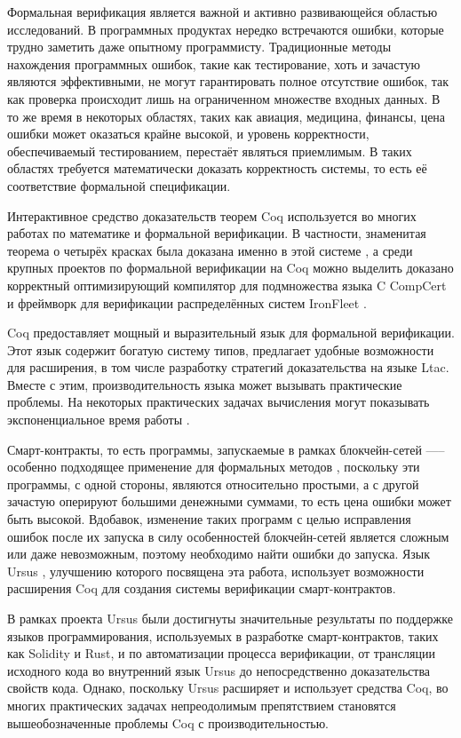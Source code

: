 \documentclass[../diploma.tex]{subfiles}
\begin{document}
 \label{sec:introduction}

Формальная верификация является важной и активно развивающейся областью исследований. В программных продуктах нередко встречаются ошибки, которые трудно заметить даже опытному программисту. Традиционные методы нахождения программных ошибок, такие как тестирование, хоть и зачастую являются эффективными, не могут гарантировать полное отсутствие ошибок, так как проверка происходит лишь на ограниченном множестве входных данных. В то же время в некоторых областях, таких как авиация, медицина, финансы, цена ошибки может оказаться крайне высокой, и уровень корректности, обеспечиваемый тестированием, перестаёт являться приемлимым. В таких областях требуется математически доказать корректность системы, то есть её соответствие формальной спецификации.

Интерактивное средство доказательств теорем Coq \cite{coq} используется во многих работах по математике и формальной верификации. В частности, знаменитая теорема о четырёх красках была доказана именно в этой системе \cite{4colors}, а среди крупных проектов по формальной верификации на Coq можно выделить доказано корректный оптимизирующий компилятор для подмножества языка C CompCert \cite{compcert} и фреймворк для верификации распределённых систем IronFleet \cite{ironfleet}.

Coq предоставляет мощный и выразительный язык для формальной верификации. Этот язык содержит богатую систему типов, предлагает удобные возможности для расширения, в том числе разработку стратегий доказательства на языке Ltac. Вместе с этим, производительность языка может вызывать практические проблемы. На некоторых практических задачах вычисления могут показывать экспоненциальное время работы \cite{coqslow} \cite{gross_phd}.

Смарт-контракты, то есть программы, запускаемые в рамках блокчейн-сетей —-- особенно подходящее применение для формальных методов \cite{smart_contracts}, поскольку эти программы, с одной стороны, являются относительно простыми, а с другой зачастую оперируют большими денежными суммами, то есть цена ошибки может быть высокой. Вдобавок, изменение таких программ с целью исправления ошибок после их запуска в силу особенностей блокчейн-сетей является сложным или даже невозможным, поэтому необходимо найти ошибки до запуска. Язык Ursus \cite{ursus}, улучшению которого посвящена эта работа, использует возможности расширения Coq для создания системы верификации смарт-контрактов. 

В рамках проекта Ursus были достигнуты значительные результаты по поддержке языков программирования, используемых в разработке смарт-контрактов, таких как Solidity и Rust, и по автоматизации процесса верификации, от трансляции исходного кода во внутренний язык Ursus до непосредственно доказательства свойств кода. Однако, поскольку Ursus расширяет и использует средства Coq, во многих практических задачах непреодолимым препятствием становятся вышеобозначенные проблемы Coq с производительностью.
\end{document}
